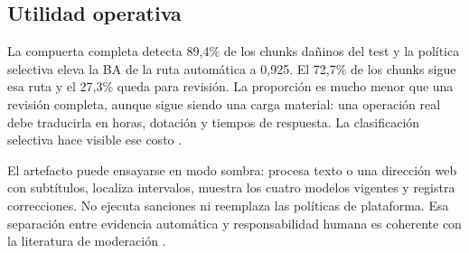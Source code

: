 \subsection{Utilidad operativa}

La compuerta completa detecta 89,4\% de los chunks dañinos del test y la política selectiva eleva la BA de la ruta automática a 0,925. El 72,7\% de los chunks sigue esa ruta y el 27,3\% queda para revisión. La proporción es mucho menor que una revisión completa, aunque sigue siendo una carga material: una operación real debe traducirla en horas, dotación y tiempos de respuesta. La clasificación selectiva hace visible ese costo \cite{geifman2017selective,mozannar2020defer}.

El artefacto puede ensayarse en modo sombra: procesa texto o una dirección web con subtítulos, localiza intervalos, muestra los cuatro modelos vigentes y registra correcciones. No ejecuta sanciones ni reemplaza las políticas de plataforma. Esa separación entre evidencia automática y responsabilidad humana es coherente con la literatura de moderación \cite{gorwa2020moderation,andersen2021rem}.
